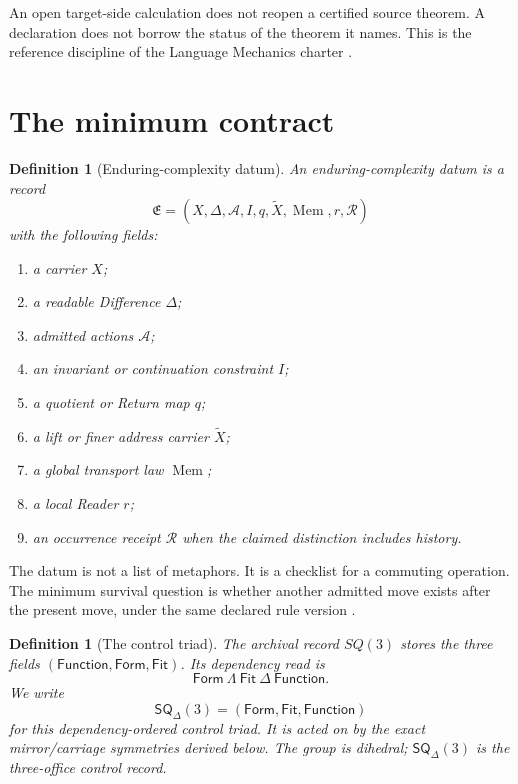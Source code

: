 \documentclass[11pt]{article}
\newtheorem{definition}[theorem]{Definition}
\newcommand{\Mem}{\operatorname{Mem}}
\newcommand{\LMForm}{\mathsf{Form}}
\newcommand{\LMFit}{\mathsf{Fit}}
\newcommand{\LMFunction}{\mathsf{Function}}
\newcommand{\SQD}{\mathsf{SQ}_{\Delta}(3)}
\begin{document}
An open target-side calculation does not reopen a certified source theorem. A declaration does not borrow the status of the theorem it names. This is the reference discipline of the Language Mechanics charter \cite{CoppaLanguageMechanics2026}.

\section{The minimum contract}

\begin{definition}[Enduring-complexity datum]
An enduring-complexity datum is a record
\[
\mathfrak E=(X,\Delta,\mathcal A,I,q,\widetilde X,\Mem,r,\mathcal R)
\]
with the following fields:
\begin{enumerate}[label=(\roman*)]
\item a carrier $X$;
\item a readable Difference $\Delta$;
\item admitted actions $\mathcal A$;
\item an invariant or continuation constraint $I$;
\item a quotient or Return map $q$;
\item a lift or finer address carrier $\widetilde X$;
\item a global transport law $\Mem$;
\item a local Reader $r$;
\item an occurrence receipt $\mathcal R$ when the claimed distinction includes history.
\end{enumerate}
\end{definition}

The datum is not a list of metaphors. It is a checklist for a commuting operation. The minimum survival question is whether another admitted move exists after the present move, under the same declared rule version \cite{CoppaIdentityReference2026,CoppaPersistence2026}.

\begin{definition}[The control triad]
The archival record $SQ(3)$ stores the three fields $(\LMFunction,\LMForm,\LMFit)$. Its dependency read is
\[
\boxed{\LMForm\ \Lambda\ \LMFit\ \Delta\ \LMFunction.}
\]
We write
\[
\SQD=(\LMForm,\LMFit,\LMFunction)
\]
for this dependency-ordered control triad. It is acted on by the exact mirror/carriage symmetries derived below. The group is dihedral; $\SQD$ is the three-office control record.
\end{definition}
\end{document}
